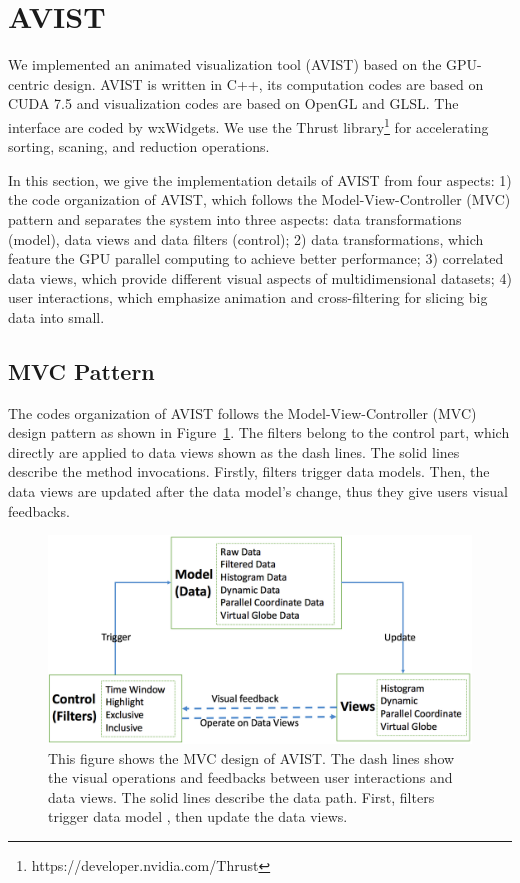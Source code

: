 \section{AVIST}
We implemented an animated visualization tool (AVIST) based on the GPU-centric design.
AVIST is written in C++, its computation codes are based on CUDA 7.5 and visualization codes are based on OpenGL and GLSL. The interface are coded by wxWidgets. We use the Thrust library\footnote{https://developer.nvidia.com/Thrust} for accelerating sorting, scaning, and reduction operations.

 

In this section, we give the implementation details of AVIST from four aspects: 1) the code organization of AVIST, which follows the Model-View-Controller (MVC) pattern and separates the system into three aspects: data transformations (model), data views and data filters (control); 2) data transformations, which feature the GPU parallel computing to achieve better performance; 3) correlated data views, which provide different visual aspects of multidimensional datasets; 4) user interactions, which emphasize  animation and cross-filtering for slicing big data into small.

\subsection{MVC Pattern}
The codes organization of AVIST follows the Model-View-Controller (MVC) design pattern as shown in Figure~\ref{fig:mvc}. The filters belong to the control part, which directly are applied to data views shown as the dash lines. The solid lines describe the method invocations. Firstly, filters trigger data models. Then, the data views are updated after the data model's change, thus they give users visual feedbacks.

\begin{figure}[htb]
	\centering
	\includegraphics[width=1.0\linewidth]{pic/mvc.png}
	\parbox[t]{1.0\columnwidth}{\relax
	}
	\caption{\label{fig:mvc} This figure shows the MVC design of AVIST. The dash lines show the visual operations and feedbacks between user interactions and data views. The solid lines describe the data path. First, filters trigger data model , then update the data views.  }
\end{figure}    


